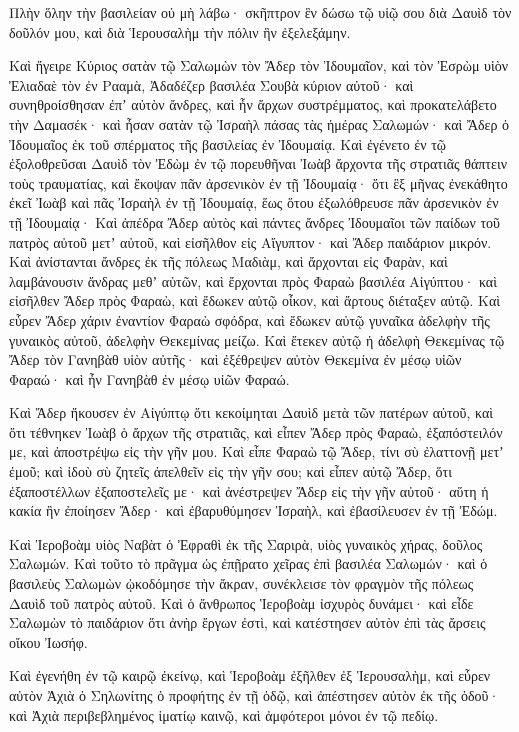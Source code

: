 {Πλὴν ὅλην τὴν βασιλείαν οὐ μὴ λάβω· σκῆπτρον ἓν δώσω τῷ υἱῷ σου διὰ Δαυὶδ τὸν δοῦλόν μου, καὶ διὰ Ἱερουσαλὴμ τὴν πόλιν ἣν ἐξελεξάμην.
\par }{\PP {}Καὶ ἤγειρε Κύριος σατὰν τῷ Σαλωμὼν τὸν Ἄδερ τὸν Ἰδουμαῖον, καὶ τὸν Ἐσρὼμ υἱὸν Ἐλιαδαὲ τὸν ἐν Ρααμὰ, Ἀδαδέζερ βασιλέα Σουβὰ κύριον αὐτοῦ· καὶ συνηθροίσθησαν ἐπʼ αὐτὸν ἄνδρες, καὶ ἦν ἄρχων συστρέμματος, καὶ προκατελάβετο τὴν Δαμασέκ· καὶ ἦσαν σατὰν τῷ Ἰσραὴλ πάσας τὰς ἡμέρας Σαλωμών· καὶ Ἄδερ ὁ Ἰδουμαῖος ἐκ τοῦ σπέρματος τῆς βασιλείας ἐν Ἰδουμαίᾳ.
Καὶ ἐγένετο ἐν τῷ ἐξολοθρεῦσαι Δαυὶδ τὸν Ἐδὼμ ἐν τῷ πορευθῆναι Ἰωὰβ ἄρχοντα τῆς στρατιᾶς θάπτειν τοὺς τραυματίας, καὶ ἔκοψαν πᾶν ἀρσενικὸν ἐν τῇ Ἰδουμαίᾳ·
ὅτι ἓξ μῆνας ἐνεκάθητο ἐκεῖ Ἰωὰβ καὶ πᾶς Ἰσραὴλ ἐν τῇ Ἰδουμαίᾳ, ἕως ὅτου ἐξωλόθρευσε πᾶν ἀρσενικὸν ἐν τῇ Ἰδουμαίᾳ·
Καὶ ἀπέδρα Ἄδερ αὐτὸς καὶ πάντες ἄνδρες Ἰδουμαῖοι τῶν παίδων τοῦ πατρὸς αὐτοῦ μετʼ αὐτοῦ, καὶ εἰσῆλθον εἰς Αἴγυπτον· καὶ Ἄδερ παιδάριον μικρόν.
Καὶ ἀνίστανται ἄνδρες ἐκ τῆς πόλεως Μαδιὰμ, καὶ ἄρχονται εἰς Φαρὰν, καὶ λαμβάνουσιν ἄνδρας μεθʼ αὑτῶν, καὶ ἔρχονται πρὸς Φαραὼ βασιλέα Αἰγύπτου· καὶ εἰσῆλθεν Ἄδερ πρὸς Φαραὼ, καὶ ἔδωκεν αὐτῷ οἶκον, καὶ ἄρτους διέταξεν αὐτῷ.
Καὶ εὗρεν Ἄδερ χάριν ἐναντίον Φαραὼ σφόδρα, καὶ ἔδωκεν αὐτῷ γυναῖκα ἀδελφὴν τῆς γυναικὸς αὐτοῦ, ἀδελφὴν Θεκεμίνας μείζω. Καὶ ἔτεκεν αὐτῷ ἡ ἀδελφὴ Θεκεμίνας τῷ Ἄδερ τὸν Γανηβὰθ υἱὸν αὐτῆς·
καὶ ἐξέθρεψεν αὐτὸν Θεκεμίνα ἐν μέσῳ υἱῶν Φαραώ· καὶ ἦν Γανηβὰθ ἐν μέσῳ υἱῶν Φαραώ.
\par }{\PP {}Καὶ Ἄδερ ἤκουσεν ἐν Αἰγύπτῳ ὅτι κεκοίμηται Δαυὶδ μετὰ τῶν πατέρων αὐτοῦ, καὶ ὅτι τέθνηκεν Ἰωὰβ ὁ ἄρχων τῆς στρατιᾶς, καὶ εἶπεν Ἄδερ πρὸς Φαραὼ, ἐξαπόστειλόν με, καὶ ἀποστρέψω εἰς τὴν γῆν μου.
Καὶ εἶπε Φαραὼ τῷ Ἄδερ, τίνι σὺ ἐλαττονῇ μετʼ ἐμοῦ; καὶ ἰδοὺ σὺ ζητεῖς ἀπελθεῖν εἰς τὴν γῆν σου; καὶ εἶπεν αὐτῷ Ἄδερ, ὅτι ἐξαποστέλλων ἐξαποστελεῖς με· καὶ ἀνέστρεψεν Ἄδερ εἰς τὴν γῆν αὐτοῦ·
αὕτη ἡ κακία ἣν ἐποίησεν Ἄδερ· καὶ ἐβαρυθύμησεν Ἰσραὴλ, καὶ ἐβασίλευσεν ἐν τῇ Ἐδώμ.
\par }{\PP {}Καὶ Ἱεροβοὰμ υἱὸς Ναβὰτ ὁ Ἐφραθὶ ἐκ τῆς Σαριρὰ, υἱὸς γυναικὸς χήρας, δοῦλος Σαλωμών.
Καὶ τοῦτο τὸ πρᾶγμα ὡς ἐπῇρατο χεῖρας ἐπὶ βασιλέα Σαλωμών· καὶ ὁ βασιλεὺς Σαλωμὼν ᾠκοδόμησε τὴν ἄκραν, συνέκλεισε τὸν φραγμὸν τῆς πόλεως Δαυὶδ τοῦ πατρὸς αὐτοῦ.
Καὶ ὁ ἄνθρωπος Ἱεροβοὰμ ἰσχυρὸς δυνάμει· καὶ εἶδε Σαλωμὼν τὸ παιδάριον ὅτι ἀνὴρ ἔργων ἐστὶ, καὶ κατέστησεν αὐτὸν ἐπὶ τὰς ἄρσεις οἴκου Ἰωσήφ.
\par }{\PP {}Καὶ ἐγενήθη ἐν τῷ καιρῷ ἐκείνῳ, καὶ Ἱεροβοὰμ ἐξῆλθεν ἐξ Ἱερουσαλὴμ, καὶ εὗρεν αὐτὸν Ἀχιὰ ὁ Σηλωνίτης ὁ προφήτης ἐν τῇ ὁδῷ, καὶ ἀπέστησεν αὐτὸν ἐκ τῆς ὁδοῦ· καὶ Ἀχιὰ περιβεβλημένος ἱματίῳ καινῷ, καὶ ἀμφότεροι μόνοι ἐν τῷ πεδίῳ.
}
